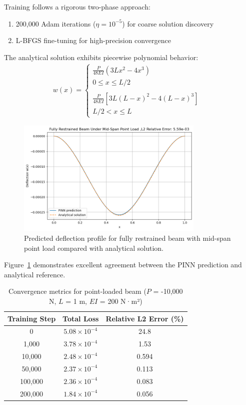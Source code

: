 \documentclass[twocolumn]{svjour3}
\begin{document}
	Training follows a rigorous two-phase approach: 
	\begin{enumerate}
		\item 200,000 Adam iterations ($\eta = 10^{-5}$) for coarse solution discovery
		\item L-BFGS fine-tuning for high-precision convergence
	\end{enumerate}
	
	The analytical solution exhibits piecewise polynomial behavior:
	\begin{align}
		w(x) = 
		\begin{cases} 
			\frac{P}{48EI}(3Lx^2 - 4x^3) & \\ 0 \leq x \leq L/2 \\ \\
			\frac{P}{48EI}[3L(L-x)^2 - 4(L-x)^3] & \\ L/2 < x \leq L 
		\end{cases}
	\end{align}
	
	\begin{figure}[htbp]
		\centering
		\includegraphics[width=0.8\textwidth]{mid_span_restrained_results}
		\caption{Predicted deflection profile for fully restrained beam with mid-span point load compared with analytical solution.}\label{fig:mid-span_restrained}
	\end{figure}
	
	Figure~\ref{fig:mid-span_restrained} demonstrates excellent agreement between the PINN prediction and analytical reference.
	
	\begin{table}[htbp]
		\centering
		\caption{Convergence metrics for point-loaded beam ($P$ = -10,000 N, $L$ = 1 m, $EI$ = 200 N·m²)}
		\begin{tabular}{c c c}
			\toprule
			\textbf{Training Step} & \textbf{Total Loss} & \textbf{Relative L2 Error (\%)} \\
			\midrule
			0 & $5.08 \times 10^{-4}$ & 24.8 \\
			1,000 & $3.78 \times 10^{-4}$ & 1.53 \\
			10,000 & $2.48 \times 10^{-4}$ & 0.594 \\
			50,000 & $2.37 \times 10^{-4}$ & 0.113 \\
			100,000 & $2.36 \times 10^{-4}$ & 0.083 \\
			200,000 & $1.84 \times 10^{-4}$ & 0.056 \\
			\bottomrule
		\end{tabular}\label{tab:point_convergence}
	\end{table}
	
\end{document}
